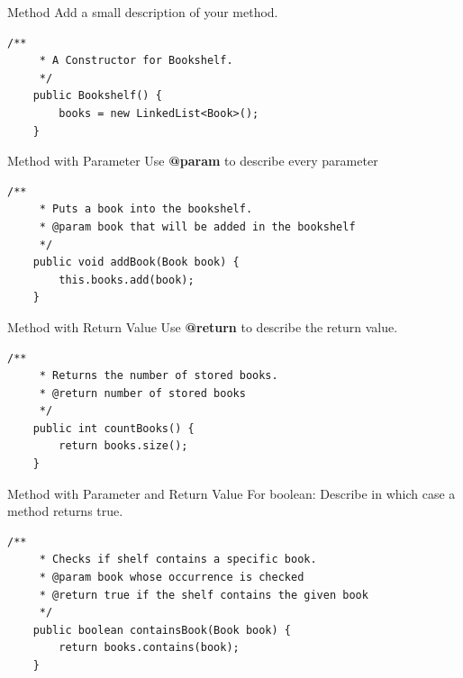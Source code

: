 \begin{frame}[fragile]{Method}
	Add a small description of your method.
	\begin{lstlisting}[basicstyle=\ttfamily\scriptsize, escapechar=!,
	commentstyle=\color{lightblue}]
	/**
	 * A Constructor for Bookshelf.
	 */
	public Bookshelf() {
	    books = new LinkedList<Book>();
	}
	\end{lstlisting}
\end{frame}

\begin{frame}[fragile]{Method with Parameter}
	Use \textbf{@param} to describe every parameter
	\begin{lstlisting}[basicstyle=\ttfamily\scriptsize, escapechar=!,
	commentstyle=\color{lightblue}]
	/**
	 * Puts a book into the bookshelf.
	 * @param book that will be added in the bookshelf
	 */
	public void addBook(Book book) {
	    this.books.add(book);
	}
	\end{lstlisting}
\end{frame}

\begin{frame}[fragile]{Method with Return Value}
	Use \textbf{@return} to describe the return value.
	\begin{lstlisting}[basicstyle=\ttfamily\scriptsize, escapechar=!,
	commentstyle=\color{lightblue}]
	/**
	 * Returns the number of stored books.
	 * @return number of stored books
	 */
	public int countBooks() {
	    return books.size();
	}
	\end{lstlisting}
	\vfill
\end{frame}

\begin{frame}[fragile]{Method with Parameter and Return Value}
	For boolean: Describe in which case a method returns true.
	\begin{lstlisting}[basicstyle=\ttfamily\scriptsize, escapechar=!,
	commentstyle=\color{lightblue}]
	/**
	 * Checks if shelf contains a specific book.
	 * @param book whose occurrence is checked
	 * @return true if the shelf contains the given book
	 */
	public boolean containsBook(Book book) {
	    return books.contains(book);
	}
	\end{lstlisting}
\end{frame}

